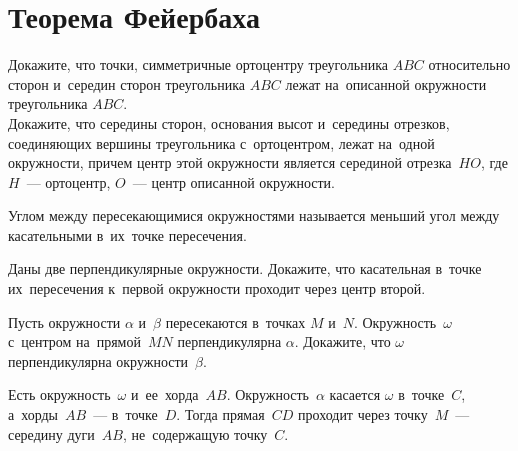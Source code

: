 
\section*{Теорема Фейербаха}


\begin{problems}

\item
\subproblem
Докажите, что точки, симметричные ортоцентру треугольника $ABC$ относительно
сторон и~середин сторон треугольника $ABC$ лежат на~описанной окружности
треугольника $ABC$.
\\
\subproblem{}
Докажите, что середины сторон, основания высот и~середины отрезков, соединяющих
вершины треугольника с~ортоцентром, лежат на~одной окружности, причем центр
этой окружности является серединой отрезка~$HO$, где $H$~--- ортоцентр,
$O$~--- центр описанной окружности.

\end{problems}

Углом между пересекающимися окружностями называется меньший угол между
касательными в~их~точке пересечения.

\begin{problems}

\item
Даны две перпендикулярные окружности.
Докажите, что касательная в~точке их~пересечения к~первой окружности проходит
через центр второй.

\item
Пусть окружности $\alpha$ и~$\beta$ пересекаются в~точках $M$ и~$N$.
Окружность~$\omega$ с~центром на~прямой~$MN$ перпендикулярна $\alpha$.
Докажите, что $\omega$ перпендикулярна окружности~$\beta$.

\end{problems}

Есть окружность~$\omega$ и~ее~хорда~$AB$.
Окружность~$\alpha$ касается $\omega$ в~точке~$C$, а~хорды~$AB$~---
в~точке~$D$.
Тогда прямая~$CD$ проходит через точку~$M$~--- середину дуги~$AB$,
не~содержащую точку~$C$.

